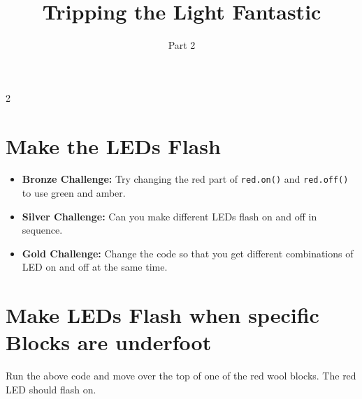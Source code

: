 \documentclass{geocraft-worksheet}
\begin{document}
\title{Tripping the Light Fantastic}
\subtitle{Part 2}

\date{}

\maketitle

\setcounter {section} {2}

\section{Make the LEDs Flash}\vspace{-0.7cm}
\lstset{language=Python}

\noindent%
%
\vspace{0.2cm}
%
%

\begin{itemize}\vspace{-0.5cm}
\item\textbf{Bronze Challenge:} Try changing the red part of \lstinline{red.on()} and \lstinline{red.off()} to use green 
  and amber.\vspace{-0.1cm}

\item\textbf{Silver Challenge:} Can you make different LEDs flash on and off in sequence.\vspace{-0.1cm}

\item\textbf{Gold Challenge:} Change the code so that you get different combinations of LED on and off at the same
  time. \vspace{-0.1cm}

\end{itemize}

\section{Make LEDs Flash when specific Blocks are underfoot}\vspace{-0.7cm}

\noindent%
%
\vspace{0.2cm}
%
%

\noindent Run the above code and move over the top of one of the red wool blocks. The red LED should flash on.
\end{document}
